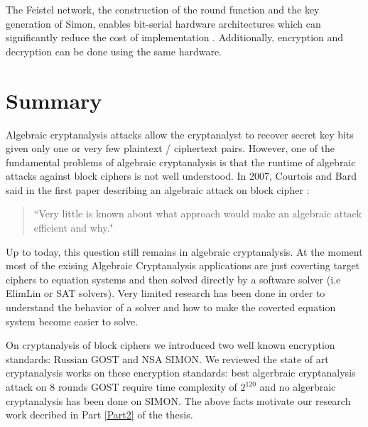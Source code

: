 The Feistel network, the construction of the round function and the key generation of Simon, enables bit-serial hardware architectures which can significantly reduce the cost of implementation \cite{simoneff}. Additionally, encryption and decryption can be done using the
same hardware.

\section{Summary} \label{sec:ACCxty}
Algebraic cryptanalysis attacks allow the cryptanalyst to recover secret key bits given only one or very few plaintext / ciphertext pairs. However, one of the fundamental problems of algebraic cryptanalysis is that the runtime of algebraic attacks against block ciphers is not well understood. In 2007, Courtois and Bard said in the first paper describing an algebraic attack on block cipher \cite{DEScourtois}:

\begin{quotation}
	``Very little is known about what approach would make an algebraic attack efficient and why." 
\end{quotation}


Up to today, this question still remains in algebraic cryptanalysis. At the moment most of the exising Algebraic Cryptanalysis applications are just coverting target ciphers to equation systems and then solved directly by a software solver  (i.e ElimLin or SAT solvers). Very limited research has been done in order to understand the behavior of a solver and how to make the coverted equation system become easier to solve. 

On cryptanalysis of block ciphers we introduced two well known encryption standards: Russian GOST and NSA SIMON. We reviewed the state of art cryptanalysis works on these encryption standards: best algerbraic cryptanalysis attack on 8 rounds GOST require time complexity of $2^{120}$ and no algerbraic cryptanalysis has been done on SIMON. The above facts motivate our research work decribed in Part \ref{Part2} of the thesis. 

